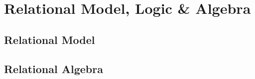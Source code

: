 \newsection
\section{Relational Model, Logic \& Algebra}
\label{sec:relational-model-logic-algebra}
\subsection{Relational Model}




\newpage
\subsection{Relational Algebra}

% 
